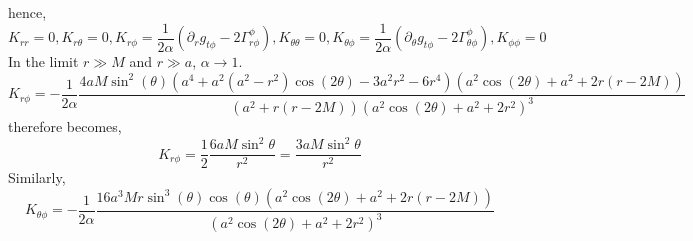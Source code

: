 \documentclass[10pt]{article}
\begin{document}
\begin{enumerate}
\begin{enumerate}
    hence,
    \begin{equation}
      \label{eq:krtheta}
      K_{rr} = 0, K_{r\theta} = 0, K_{r\phi} = \frac{1}{2\alpha}(\partial_rg_{t\phi} - 2\Gamma^\phi_{r\phi}), K_{\theta\theta} = 0, K_{\theta\phi} = \frac{1}{2\alpha}(\partial_\theta g_{t\phi}-2\Gamma^\phi_{\theta\phi}), K_{\phi\phi} = 0 
    \end{equation}
    In the limit $r\gg M$ and $r\gg a$, $\alpha \to 1$.
    \begin{equation}
      \label{eq:krphi}
      K_{r\phi} = -\frac{1}{2\alpha}\frac{4 a M \sin ^2(\theta ) \left(a^4+a^2 \left(a^2-r^2\right) \cos (2 \theta )-3 a^2 r^2-6 r^4\right) \left(a^2 \cos (2 \theta )+a^2+2 r (r-2 M)\right)}{\left(a^2+r
   (r-2 M)\right) \left(a^2 \cos (2 \theta )+a^2+2 r^2\right)^3}
\end{equation}
therefore becomes,
\begin{equation}
  \label{eq:krphi2}
  K_{r\phi} = \frac{1}{2}\frac{6aM\sin^2\theta}{r^2} = \frac{3aM\sin^2\theta}{r^2}  
\end{equation}
Similarly,
\begin{equation}
  \label{eq:kthetaphi}
  K_{\theta \phi} = - \frac{1}{2\alpha}\frac{16 a^3 M r \sin ^3(\theta ) \cos (\theta ) \left(a^2 \cos (2 \theta )+a^2+2 r (r-2 M)\right)}{\left(a^2 \cos (2 \theta )+a^2+2 r^2\right)^3} 
\end{equation}
  \end{enumerate}
\end{enumerate}
\end{document}
